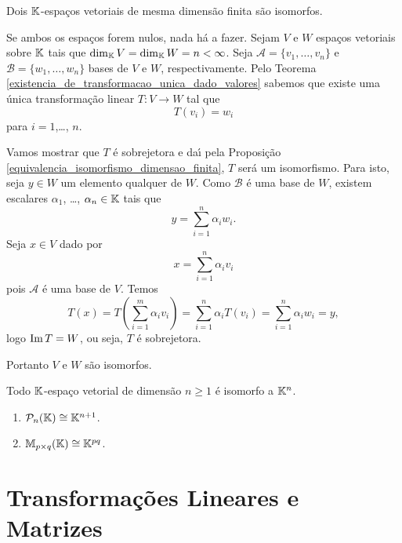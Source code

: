 \begin{teorema}\label{teorema_espacos_isomorfos}
  Dois $\mathbb{K}$-espa\c{c}os vetoriais de mesma dimens\~ao finita s\~ao isomorfos.
\end{teorema}
\begin{prova}
  Se ambos os espa\c{c}os forem nulos, nada h\'a a fazer. Sejam $V$ e $W$ espa\c{c}os vetoriais sobre $\mathbb{K}$ tais que $\dim_{\mathbb{K}}V = \dim_{\mathbb{K}}W = n < \infty$. Seja $\mathcal{A} = \{v_1,\dots,v_n\}$ e $\mathcal{B} = \{w_1,\dots,w_n\}$ bases de $V$ e $W$, respectivamente. Pelo Teorema \ref{existencia_de_transformacao_unica_dado_valores} sabemos que existe uma \'unica transforma\c{c}\~ao linear $T : V \to W$ tal que
  \[
    T(v_i) = w_i
  \]
  para $i=1$,\dots, $n$.

  Vamos mostrar que $T$ \'e sobrejetora e da{\'\i} pela Proposi\c{c}\~ao \ref{equivalencia_isomorfismo_dimensao_finita}, $T$ ser\'a um isomorfismo. Para isto, seja $y \in W$ um elemento qualquer de $W$. Como $\mathcal{B}$ \'e uma base de $W$, existem escalares $\alpha_1$, \dots, $\alpha_n \in \mathbb{K}$ tais que
  \[
    y = \sum_{i=1}^n\alpha_iw_i.
  \]
  Seja $x \in V$ dado por
  \[
    x = \sum_{i=1}^n\alpha_iv_i
  \]
  pois $\mathcal{A}$ \'e uma base de $V$. Temos
  \[
    T(x) = T(\sum_{i=1}^m\alpha_iv_i) = \sum_{i=1}^n\alpha_iT(v_i) = \sum_{i=1}^n\alpha_iw_i = y,
  \]
  logo ${\rm Im\,} T = W$, ou seja, $T$ \'e sobrejetora.

  Portanto $V$ e $W$ s\~ao isomorfos.
\end{prova}

\begin{corolario}
  Todo $\mathbb{K}$-espa\c{c}o vetorial de dimens\~ao $n \ge 1$ \'e isomorfo a $\mathbb{K}^n$.
\end{corolario}

\begin{exemplos}
  \begin{enumerate}[label={\arabic*})]
    \item $\mathcal{P}_n(\mathbb{K}) \cong \mathbb{K}^{n+1}$.
    \item $\mathbb{M}_{p\times q}(\mathbb{K}) \cong \mathbb{K}^{pq}$.
  \end{enumerate}
\end{exemplos}

\section{Transforma\c{c}\~oes Lineares e Matrizes} %
\label{sec:transformacoes_lineares_e_matrizes}

